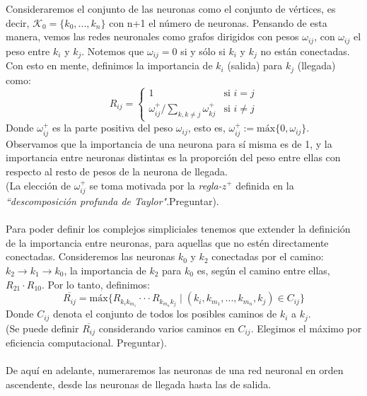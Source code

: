 \documentclass[12pt]{article}
\numberwithin{equation}{section}
\theoremstyle{definition}
\theoremstyle{remark}
\theoremstyle{plain}
\begin{document}
		Consideraremos el conjunto de las neuronas como el conjunto de vértices, es decir, $\mathcal{K}_{0}=\{k_{0},...,k_{n}\}$ con n+1 el número de neuronas. Pensando de esta manera, vemos las redes
		neuronales como grafos dirigidos con pesos $\omega_{ij}$, con $\omega_{ij}$ el peso entre $k_{i}$ y $k_{j}$. Notemos que $\omega_{ij}=0$ si y sólo si $k_{i}$ y $k_{j}$ no están conectadas.
		Con esto en mente, definimos la importancia de $k_{i}$ (salida) para $k_{j}$ (llegada) como:
		\begin{equation}
			R_{ij}=  \left \{ 
				\begin{array}{ll}
					1 & \text{si } i=j \\
					\omega_{ij}^{+}/\sum_{k,k \neq j}\omega_{kj}^{+} & \text{si } i \neq j
				\end{array}
			\right. 
		\end{equation}
		Donde $\omega_{ij}^{+}$ es la parte positiva del peso $\omega_{ij}$, esto es, $\omega_{ij}^{+}:=\text{máx}\{0,\omega_{ij}\}$.\\ 
		Observamos que la importancia de una neurona para sí misma es de 1, y la importancia entre neuronas distintas es la proporción del peso entre ellas con respecto 
		al resto de pesos de la neurona de llegada.\\
		(La elección de $\omega_{ij}^{+}$ se toma motivada por la \textit{regla-}$z^{+}$ definida en la 
		\textit{``descomposición profunda de Taylor"}.Preguntar). \\
		\\
		Para poder definir los complejos simpliciales tenemos que extender la definición de la importancia entre neuronas, para aquellas que no estén directamente conectadas. Consideremos 
		las neuronas $k_{0}$ y $k_{2}$ conectadas por el camino: $k_{2} \rightarrow k_{1} \rightarrow k_{0}$, la importancia de $k_{2}$ para $k_{0}$ es, según el camino entre ellas, $R_{21} \cdot R_{10}$.
		Por lo tanto, definimos:
		\begin{equation}
			\overline{R_{ij}}=\text{máx}\{R_{k_{i}k_{m_{1}}} \cdot\cdot\cdot R_{k_{m_{n}}k_{j}} \mid (k_{i},k_{m_{1}},...,k_{m_{n}},k_{j}) \in C_{ij} \}
			\label{def:ie}
		\end{equation}	
		Donde $C_{ij}$ denota el conjunto de todos los posibles caminos de $k_{i}$ a $k_{j}$. \\
		(Se puede definir $\overline{R_{ij}}$ considerando varios caminos en $C_{ij}$. Elegimos el máximo 
		por eficiencia computacional. Preguntar). \\
		\\
		De aquí en adelante, numeraremos las neuronas de una red neuronal en orden ascendente, desde las neuronas de llegada hasta las de salida.\\
		
\end{document}
